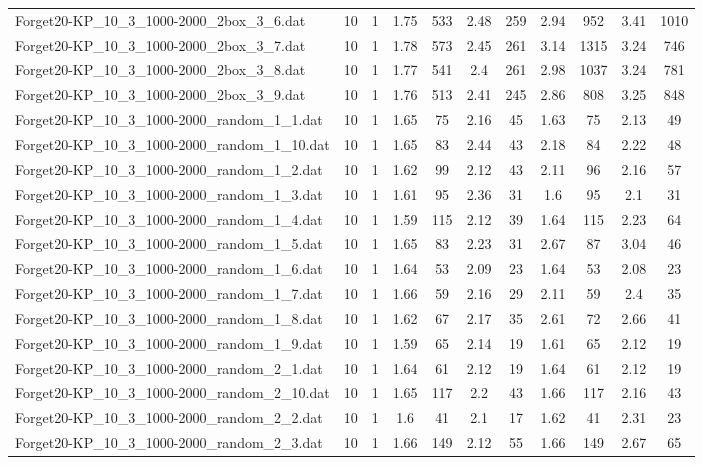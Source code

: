 \begin{table}[!ht]
\begin{tabular}{lcccccccccc}
Forget20-KP\_10\_3\_1000-2000\_2box\_3\_6.dat & 10 & 1 & 1.75 & 533 & 2.48 & 259 & 2.94 & 952 & 3.41 & 1010 \\
Forget20-KP\_10\_3\_1000-2000\_2box\_3\_7.dat & 10 & 1 & 1.78 & 573 & 2.45 & 261 & 3.14 & 1315 & 3.24 & 746 \\
Forget20-KP\_10\_3\_1000-2000\_2box\_3\_8.dat & 10 & 1 & 1.77 & 541 & 2.4 & 261 & 2.98 & 1037 & 3.24 & 781 \\
Forget20-KP\_10\_3\_1000-2000\_2box\_3\_9.dat & 10 & 1 & 1.76 & 513 & 2.41 & 245 & 2.86 & 808 & 3.25 & 848 \\
Forget20-KP\_10\_3\_1000-2000\_random\_1\_1.dat & 10 & 1 & 1.65 & 75 & 2.16 & 45 & 1.63 & 75 & 2.13 & 49 \\
Forget20-KP\_10\_3\_1000-2000\_random\_1\_10.dat & 10 & 1 & 1.65 & 83 & 2.44 & 43 & 2.18 & 84 & 2.22 & 48 \\
Forget20-KP\_10\_3\_1000-2000\_random\_1\_2.dat & 10 & 1 & 1.62 & 99 & 2.12 & 43 & 2.11 & 96 & 2.16 & 57 \\
Forget20-KP\_10\_3\_1000-2000\_random\_1\_3.dat & 10 & 1 & 1.61 & 95 & 2.36 & 31 & 1.6 & 95 & 2.1 & 31 \\
Forget20-KP\_10\_3\_1000-2000\_random\_1\_4.dat & 10 & 1 & 1.59 & 115 & 2.12 & 39 & 1.64 & 115 & 2.23 & 64 \\
Forget20-KP\_10\_3\_1000-2000\_random\_1\_5.dat & 10 & 1 & 1.65 & 83 & 2.23 & 31 & 2.67 & 87 & 3.04 & 46 \\
Forget20-KP\_10\_3\_1000-2000\_random\_1\_6.dat & 10 & 1 & 1.64 & 53 & 2.09 & 23 & 1.64 & 53 & 2.08 & 23 \\
Forget20-KP\_10\_3\_1000-2000\_random\_1\_7.dat & 10 & 1 & 1.66 & 59 & 2.16 & 29 & 2.11 & 59 & 2.4 & 35 \\
Forget20-KP\_10\_3\_1000-2000\_random\_1\_8.dat & 10 & 1 & 1.62 & 67 & 2.17 & 35 & 2.61 & 72 & 2.66 & 41 \\
Forget20-KP\_10\_3\_1000-2000\_random\_1\_9.dat & 10 & 1 & 1.59 & 65 & 2.14 & 19 & 1.61 & 65 & 2.12 & 19 \\
Forget20-KP\_10\_3\_1000-2000\_random\_2\_1.dat & 10 & 1 & 1.64 & 61 & 2.12 & 19 & 1.64 & 61 & 2.12 & 19 \\
Forget20-KP\_10\_3\_1000-2000\_random\_2\_10.dat & 10 & 1 & 1.65 & 117 & 2.2 & 43 & 1.66 & 117 & 2.16 & 43 \\
Forget20-KP\_10\_3\_1000-2000\_random\_2\_2.dat & 10 & 1 & 1.6 & 41 & 2.1 & 17 & 1.62 & 41 & 2.31 & 23 \\
Forget20-KP\_10\_3\_1000-2000\_random\_2\_3.dat & 10 & 1 & 1.66 & 149 & 2.12 & 55 & 1.66 & 149 & 2.67 & 65 \\

\end{tabular}
\end{table}
